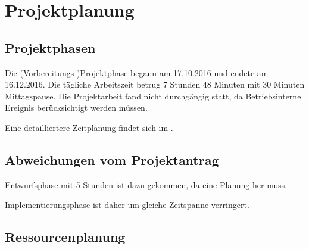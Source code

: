 

\section{Projektplanung} 
\label{sec:Projektplanung}


\subsection{Projektphasen}
\label{sec:Projektphasen}

Die (Vorbereitungs-)Projektphase begann am 17.10.2016 und endete am 16.12.2016.
Die tägliche Arbeitszeit betrug 7 Stunden 48 Minuten mit 30 Minuten Mittagspause.
Die Projektarbeit fand nicht durchgängig statt, da Betriebsinterne Ereignis berücksichtigt werden müssen.


Eine detailliertere Zeitplanung findet sich im .

\subsection{Abweichungen vom Projektantrag}
\label{sec:AbweichungenProjektantrag}

Entwurfsphase mit 5 Stunden ist dazu gekommen, da eine Planung her muss.

Implementierungsphase ist daher um gleiche Zeitspanne verringert.  %

\subsection{Ressourcenplanung}
\label{sec:Ressourcenplanung}


